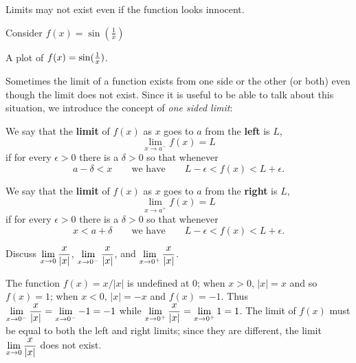 Limits may not exist even if the function looks innocent. 

\begin{example}
Consider $f(x) = \sin(\frac{1}{x})$
\end{example}
\begin{marginfigure}
\caption{A plot of $f(x)=\protect\sin(\frac{1}{x})$.}
\label{plot:sin 1/x}
\end{marginfigure}

Sometimes the limit of a function exists from one side or the other
(or both) even though the limit does not exist. Since it is useful to
be able to talk about this situation, we introduce the concept of
\textit{one sided limit}:

\begin{definition} We say that the \textbf{limit} of $f(x)$ as $x$ goes to $a$ from the \textbf{left} is $L$,
\[
\lim_{x\to a^-}f(x)=L
\]
if for every $\epsilon>0$ there is a $\delta > 0$ so that whenever 
\[
a-\delta < x \qquad\text{we have}\qquad L-\epsilon< f(x)<L+\epsilon.
\]

We say that the \textbf{limit} of $f(x)$ as $x$ goes to $a$ from the \textbf{right} is $L$,
\[
\lim_{x\to a^+}f(x)=L
\] 
if for every $\epsilon>0$ there is a $\delta > 0$ so that whenever
\[
x<a+\delta \qquad\text{we have}\qquad L-\epsilon< f(x)<L+\epsilon.
\]
\end{definition}

\begin{example}
Discuss $\displaystyle\lim_{x\to 0}{x\over|x|}$, 
$\displaystyle\lim_{x\to 0^-}{x\over|x|}$,
and $\displaystyle\lim_{x\to 0^+}{x\over|x|}$.

The function $f(x)=x/|x|$ is undefined at 0; when $x>0$, $|x|=x$ and
so $f(x)=1$; when $x<0$, $|x|=-x$ and $f(x)=-1$. Thus
$\displaystyle \lim_{x\to 0^-}{x\over|x|}=\lim_{x\to 0^-}-1=-1$ while 
$\displaystyle \lim_{x\to 0^+}{x\over|x|}=\lim_{x\to 0^+}1=1$. The limit of $f(x)$
must be equal to both the left and right limits; since they are
different, the limit $\displaystyle \lim_{x\to 0}{x\over|x|}$ does not exist.
\end{example}




